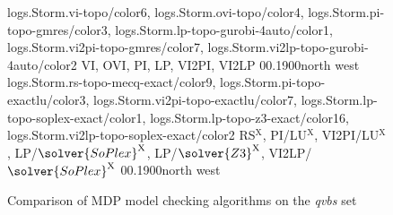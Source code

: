 
\begin{figure*}[t]
	\centering
	{logs.Storm.vi-topo/color6, logs.Storm.ovi-topo/color4, logs.Storm.pi-topo-gmres/color3, logs.Storm.lp-topo-gurobi-4auto/color1, logs.Storm.vi2pi-topo-gmres/color7, logs.Storm.vi2lp-topo-gurobi-4auto/color2}
	{VI, OVI, PI, LP, VI2PI, VI2LP}
	{0}{\numcommunity}{0.1}{900}{north west}%
	{logs.Storm.rs-topo-mecq-exact/color9, logs.Storm.pi-topo-exactlu/color3, logs.Storm.vi2pi-topo-exactlu/color7, logs.Storm.lp-topo-soplex-exact/color1, logs.Storm.lp-topo-z3-exact/color16, logs.Storm.vi2lp-topo-soplex-exact/color2}
	{RS$^\mathrm{X}$, PI/LU$^\mathrm{X}$, VI2PI/LU$^\mathrm{X}$, LP/$\solver{SoPlex}^\mathrm{X}$, LP/$\solver{Z3}^\mathrm{X}$, VI2LP/$\solver{SoPlex}^\mathrm{X}$}
	{0}{\numcommunity}{0.1}{900}{north west}
	\caption{Comparison of MDP model checking algorithms on the \textit{qvbs} set}
	\label{fig:MethodsQVBS}
\end{figure*}
